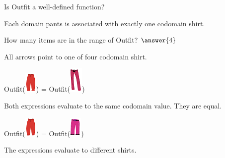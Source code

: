 \documentclass{ximera}
\begin{document}
\begin{exercise}
Is Outfit a well-defined function?
  \begin{multipleChoice}
  \end{multipleChoice}
  \begin{feedback}
Each domain pants is associated with exactly one codomain shirt.
  \end{feedback}
\end{exercise}





\begin{exercise}
How many items are in the range of Outfit? $\answer{4}$
  \begin{feedback}
All arrows point to one of four codomain shirt.
  \end{feedback}
\end{exercise}







\begin{exercise}
 Outfit({\includegraphics[width=22px,height=37px]{pics/elements/pants/pants5.png}}) = Outfit({\includegraphics[width=24px,height=47px]{pics/elements/pants/pants6.png}}) 
  \begin{multipleChoice}
  \end{multipleChoice}
  \begin{feedback}
Both expressions evaluate to the same codomain value.  They are equal.
  \end{feedback}
\end{exercise}




\begin{exercise}
 Outfit({\includegraphics[width=22px,height=37px]{pics/elements/pants/pants5.png}}) = Outfit({\includegraphics[width=22px,height=36px]{pics/elements/pants/pants4.png}}) 
  \begin{multipleChoice}
  \end{multipleChoice}
  \begin{feedback}
The expressions evaluate to different shirts.
  \end{feedback}
\end{exercise}
\end{document}

